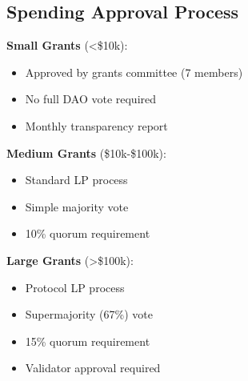 \subsection{Spending Approval Process}

\textbf{Small Grants} (<\$10k):
\begin{itemize}
\item Approved by grants committee (7 members)
\item No full DAO vote required
\item Monthly transparency report
\end{itemize}

\textbf{Medium Grants} (\$10k-\$100k):
\begin{itemize}
\item Standard LP process
\item Simple majority vote
\item 10\% quorum requirement
\end{itemize}

\textbf{Large Grants} (>\$100k):
\begin{itemize}
\item Protocol LP process
\item Supermajority (67\%) vote
\item 15\% quorum requirement
\item Validator approval required
\end{itemize}

